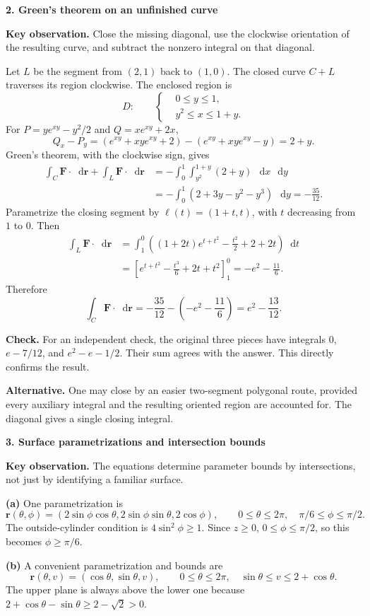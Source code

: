 \documentclass[11pt,letterpaper]{article}
\renewcommand{\vec}[1]{\mathbf{#1}}
\newcommand{\dd}{\mathop{}\!\mathrm{d}}
\newcommand{\solutionproblem}[3]{%
  \par\bigskip\Needspace{7\baselineskip}
  \noindent\textbf{#1. #2}\par\nobreak
}
\newcommand{\insight}[1]{\par\textbf{Key observation.} #1\par}
\newcommand{\verification}[1]{\par\textbf{Check.} #1\par}
\newcommand{\alternative}[1]{\par\textbf{Alternative.} #1\par}
\begin{document}
\solutionproblem{2}{Green's theorem on an unfinished curve}{12}
\insight{Close the missing diagonal, use the clockwise orientation of the
resulting curve, and subtract the nonzero integral on that diagonal.}
Let $L$ be the segment from $(2,1)$ back to $(1,0)$. The closed curve
$C+L$ traverses its region clockwise. The enclosed region is
\[
D:\qquad
\left\{
\begin{aligned}
&0\le y\le1,\\
&y^2\le x\le1+y.
\end{aligned}
\right.
\]
For $P=ye^{xy}-y^2/2$ and $Q=xe^{xy}+2x$,
\[
Q_x-P_y=(e^{xy}+xye^{xy}+2)
 -(e^{xy}+xye^{xy}-y)=2+y.
\]
Green's theorem, with the clockwise sign, gives
\[
\begin{aligned}
\int_C\vec F\cdot\dd\vec r+\int_L\vec F\cdot\dd\vec r
&=-\int_0^1\int_{y^2}^{1+y}(2+y)\,\dd x\,\dd y\\
&=-\int_0^1(2+3y-y^2-y^3)\,\dd y=-\frac{35}{12}.
\end{aligned}
\]
Parametrize the closing segment by
$\vec\ell(t)=(1+t,t)$, with $t$ decreasing from $1$ to $0$. Then
\[
\begin{aligned}
\int_L\vec F\cdot\dd\vec r
&=\int_1^0\left((1+2t)e^{t+t^2}-\frac{t^2}{2}+2+2t\right)\dd t\\
&=\left[e^{t+t^2}-\frac{t^3}{6}+2t+t^2\right]_1^0
=-e^2-\frac{11}{6}.
\end{aligned}
\]
Therefore
\[
\boxed{\displaystyle\int_C\vec F\cdot\dd\vec r
=-\frac{35}{12}-\left(-e^2-\frac{11}{6}\right)
=e^2-\frac{13}{12}}.
\]
\verification{For an independent check, the original three pieces have
integrals $0$, $e-7/12$, and $e^2-e-1/2$. Their sum agrees with the
answer. This directly confirms the result.}
\alternative{One may close by an easier two-segment polygonal route,
provided every auxiliary integral and the resulting oriented region are
accounted for. The diagonal gives a single closing integral.}

\solutionproblem{3}{Surface parametrizations and intersection bounds}{12}
\insight{The equations determine parameter bounds by intersections, not
just by identifying a familiar surface.}
\textbf{(a)} One parametrization is
\[
\boxed{\vec r(\theta,\phi)
=(2\sin\phi\cos\theta,2\sin\phi\sin\theta,2\cos\phi)},
\qquad
\boxed{0\le\theta\le2\pi,\quad\pi/6\le\phi\le\pi/2}.
\]
The outside-cylinder condition is $4\sin^2\phi\ge1$. Since $z\ge0$,
$0\le\phi\le\pi/2$, so this becomes $\phi\ge\pi/6$.

\textbf{(b)} A convenient parametrization and bounds are
\[
\boxed{\vec r(\theta,v)=(\cos\theta,\sin\theta,v)},\qquad
\boxed{0\le\theta\le2\pi,\quad\sin\theta\le v\le2+\cos\theta}.
\]
The upper plane is always above the lower one because
$2+\cos\theta-\sin\theta\ge2-\sqrt2>0$.
\end{document}
